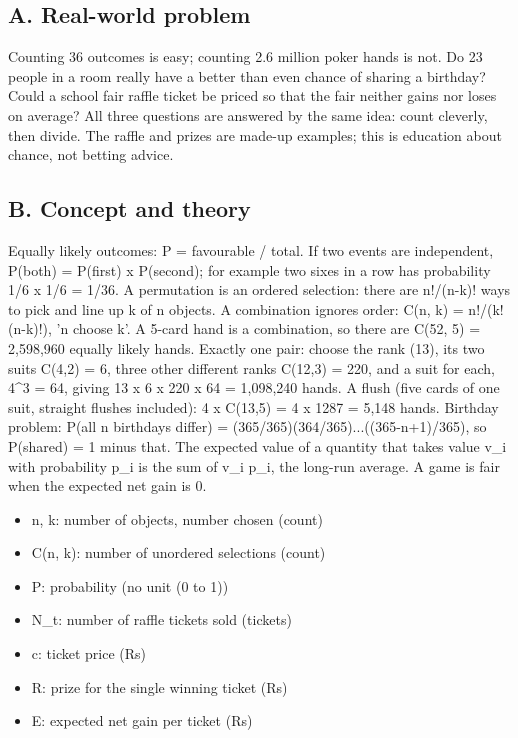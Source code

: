 \documentclass[11pt,a4paper]{article}
\begin{document}
\subsection*{A. Real-world problem}
Counting 36 outcomes is easy; counting 2.6 million poker hands is not. Do 23 people in a room really have a better than even chance of sharing a birthday? Could a school fair raffle ticket be priced so that the fair neither gains nor loses on average? All three questions are answered by the same idea: count cleverly, then divide. The raffle and prizes are made-up examples; this is education about chance, not betting advice.

\subsection*{B. Concept and theory}
Equally likely outcomes: P = favourable / total. If two events are independent, P(both) = P(first) x P(second); for example two sixes in a row has probability 1/6 x 1/6 = 1/36. A permutation is an ordered selection: there are n!/(n-k)! ways to pick and line up k of n objects. A combination ignores order: C(n, k) = n!/(k!(n-k)!), 'n choose k'. A 5-card hand is a combination, so there are C(52, 5) = 2,598,960 equally likely hands. Exactly one pair: choose the rank (13), its two suits C(4,2) = 6, three other different ranks C(12,3) = 220, and a suit for each, 4\textasciicircum{}3 = 64, giving 13 x 6 x 220 x 64 = 1,098,240 hands. A flush (five cards of one suit, straight flushes included): 4 x C(13,5) = 4 x 1287 = 5,148 hands. Birthday problem: P(all n birthdays differ) = (365/365)(364/365)...((365-n+1)/365), so P(shared) = 1 minus that. The expected value of a quantity that takes value v\_i with probability p\_i is the sum of v\_i p\_i, the long-run average. A game is fair when the expected net gain is 0.

\begin{itemize}[nosep]
\item n, k: number of objects, number chosen (count)
\item C(n, k): number of unordered selections (count)
\item P: probability (no unit (0 to 1))
\item N\_t: number of raffle tickets sold (tickets)
\item c: ticket price (Rs)
\item R: prize for the single winning ticket (Rs)
\item E: expected net gain per ticket (Rs)
\end{itemize}
\end{document}
